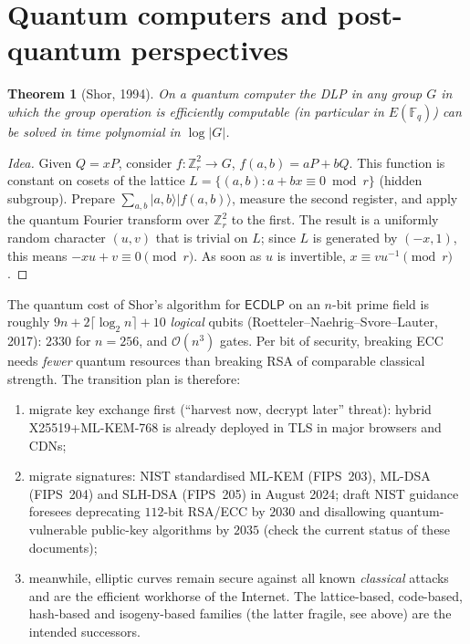 \documentclass[11pt,a4paper,oneside]{book}
\theoremstyle{plain}
\newtheorem{theorem}{Theorem}[chapter]
\theoremstyle{definition}
\theoremstyle{remark}
\newcommand{\Z}{\mathbb{Z}}
\newcommand{\Fq}{\mathbb{F}_q}
\newcommand{\bigO}{\mathcal{O}}
\newcommand{\ECDLP}{\mathsf{ECDLP}}
\begin{document}
\section{Quantum computers and post-quantum perspectives}

\begin{theorem}[Shor, 1994]
On a quantum computer the DLP in any group $G$ in which the group operation is efficiently computable (in particular in $E(\Fq)$) can be solved in time polynomial in $\log|G|$.
\end{theorem}
\begin{proof}[Idea]
Given $Q=xP$, consider $f:\Z_r^2\to G$, $f(a,b)=aP+bQ$. This function is constant on cosets of the lattice $L=\{(a,b):a+bx\equiv0\bmod r\}$ (hidden subgroup). Prepare $\sum_{a,b}|a,b\rangle|f(a,b)\rangle$, measure the second register, and apply the quantum Fourier transform over $\Z_r^2$ to the first. The result is a uniformly random character $(u,v)$ that is trivial on $L$; since $L$ is generated by $(-x,1)$, this means $-xu+v\equiv0\pmod r$. As soon as $u$ is invertible, $x\equiv vu^{-1}\pmod r$.
\end{proof}

The quantum cost of Shor's algorithm for $\ECDLP$ on an $n$-bit prime field is roughly $9n+2\lceil\log_2n\rceil+10$ \emph{logical} qubits (Roetteler--Naehrig--Svore--Lauter, 2017): $2330$ for $n=256$, and $\bigO(n^3)$ gates. Per bit of security, breaking ECC needs \emph{fewer} quantum resources than breaking RSA of comparable classical strength. The transition plan is therefore:
\begin{enumerate}[nosep]
\item migrate key exchange first (``harvest now, decrypt later'' threat): hybrid X25519+ML-KEM-768 is already deployed in TLS in major browsers and CDNs;
\item migrate signatures: NIST standardised ML-KEM (FIPS~203), ML-DSA (FIPS~204) and SLH-DSA (FIPS~205) in August 2024; draft NIST guidance foresees deprecating $112$-bit RSA/ECC by $2030$ and disallowing quantum-vulnerable public-key algorithms by $2035$ (check the current status of these documents);
\item meanwhile, elliptic curves remain secure against all known \emph{classical} attacks and are the efficient workhorse of the Internet. The lattice-based, code-based, hash-based and isogeny-based families (the latter fragile, see above) are the intended successors.
\end{enumerate}
\end{document}
